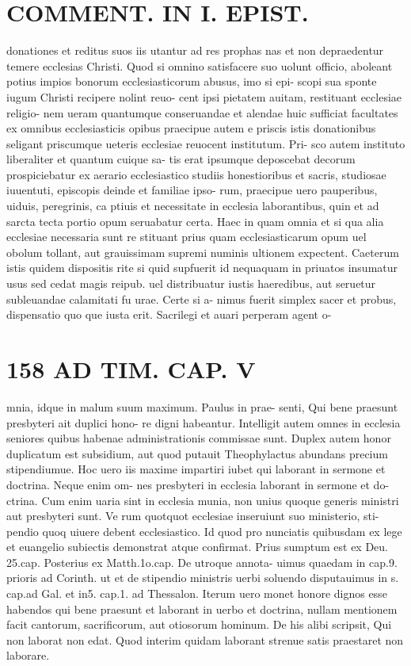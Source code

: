 \documentclass{article}
\begin{document}
\begin{pages}
\section*{COMMENT. IN I. EPIST. }\pstart donationes et reditus suos iis utantur ad res prophas nas et non depraedentur temere ecclesias Christi. Quod si omnino satisfacere suo uolunt officio, aboleant potius impios bonorum ecclesiasticorum abusus, imo si epi- scopi sua sponte iugum Christi recipere nolint reuo- cent ipsi pietatem auitam, restituant ecclesiae religio- nem ueram quantumque conseruandae et alendae huic sufficiat facultates ex omnibus ecclesiasticis opibus praecipue autem e priscis istis donationibus seligant priscumque ueteris ecclesiae reuocent institutum. Pri- sco autem instituto liberaliter et quantum cuique sa- tis erat ipsumque deposcebat decorum prospiciebatur ex aerario ecclesiastico studiis honestioribus et sacris, studiosae iuuentuti, episcopis deinde et familiae ipso- rum, praecipue uero pauperibus, uiduis, peregrinis, ca ptiuis et necessitate in ecclesia laborantibus, quin et ad sarcta tecta portio opum seruabatur certa. Haec in quam omnia et si qua alia ecclesiae necessaria sunt re stituant prius quam ecclesiasticarum opum uel obolum tollant, aut grauissimam supremi numinis ultionem expectent. Caeterum istis quidem dispositis rite si quid supfuerit id nequaquam in priuatos insumatur usus sed cedat magis reipub. uel distribuatur iustis haeredibus, aut seruetur subleuandae calamitati fu urae. Certe si a- nimus fuerit simplex sacer et probus, dispensatio quo que iusta erit. Sacrilegi et auari perperam agent o-  \pend
\section*{158 AD TIM. CAP. V }
\marginpar{[ p.158 ]}\pstart mnia, idque in malum suum maximum. Paulus in prae- senti, Qui bene praesunt presbyteri ait duplici hono- re digni habeantur. Intelligit autem omnes in ecclesia seniores quibus habenae administrationis commissae sunt. Duplex autem honor duplicatum est subsidium, aut quod putauit Theophylactus abundans precium stipendiumue. Hoc uero iis maxime impartiri iubet qui laborant in sermone et doctrina. Neque enim om- nes presbyteri in ecclesia laborant in sermone et do- ctrina. Cum enim uaria sint in ecclesia munia, non unius quoque generis ministri aut presbyteri sunt. Ve rum quotquot ecclesiae inseruiunt suo ministerio, sti- pendio quoq uiuere debent ecclesiastico. Id quod pro nunciatis quibusdam ex lege et euangelio subiectis demonstrat atque confirmat. Prius sumptum est ex Deu. 25.cap. Posterius ex Matth.1o.cap. De utroque annota- uimus quaedam in cap.9. prioris ad Corinth. ut et de stipendio ministris uerbi soluendo disputauimus in s. cap.ad Gal. et in5. cap.1. ad Thessalon. Iterum uero monet honore dignos esse habendos qui bene praesunt et laborant in uerbo et doctrina, nullam mentionem facit cantorum, sacrificorum, aut otiosorum hominum. De his alibi scripsit, Qui non laborat non edat. Quod interim quidam laborant strenue satis praestaret non laborare.  \pend

\end{pages}
\end{document}
